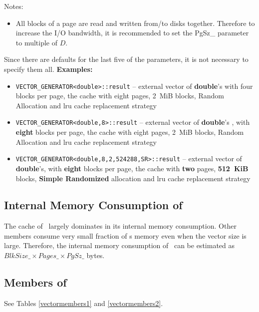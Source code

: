 \documentclass[twoside]{book}
\begin{document}
Notes:
\begin{itemize}
\item All blocks of a page are read and written from/to
disks together. Therefore to increase the I/O bandwidth, it is
recommended to set the PgSz\_ parameter to multiple of $D$.
\end{itemize}

Since there are defaults for the last five
of the parameters, it is not necessary to specify them all.
{\bf Examples:}
\begin{itemize}
\item \texttt{VECTOR\_GENERATOR<double>::result} -- external vector of
{\bf double}'s with four blocks per page, the cache with eight pages, 2~MiB
blocks, Random  Allocation and lru cache replacement strategy 
\item \texttt{VECTOR\_GENERATOR<double,8>::result} -- external vector
of {\bf double}'s , with {\bf eight} blocks per page, the cache with eight pages, 2~MiB
blocks, Random  Allocation and lru cache replacement strategy 
\item \texttt{VECTOR\_GENERATOR<double,8,2,524288,SR>::result} --
external vector of {\bf double}'s, with {\bf eight} blocks per page, the cache
with {\bf two} pages, {\bf 512~KiB} 
blocks, {\bf Simple Randomized} allocation and lru cache replacement strategy 
\end{itemize}

\subsection{Internal Memory Consumption of \xvector}
The cache of \xvector\ largely dominates in its internal memory
consumption. Other members consume very small fraction of \xvector s
memory even when the vector size is large. Therefore, the internal
memory consumption of \xvector\ can be estimated as
$BlkSize\_ \times Pages\_ \times PgSz\_$ bytes.



\subsection{Members of \xvector}
See Tables \ref{vectormembers1} and  \ref{vectormembers2}.
\end{document}
